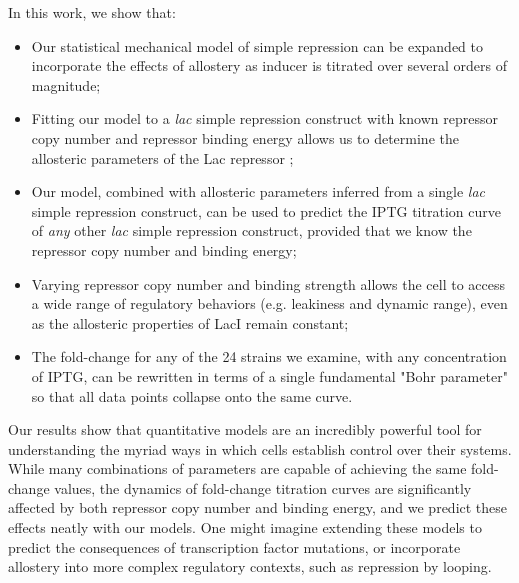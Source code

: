 In this work, we show that:
\begin{itemize}
	\item Our statistical mechanical model of simple repression can be expanded to incorporate the effects of allostery as inducer is titrated over several orders of magnitude;
	\item Fitting our model to a \textit{lac} simple repression construct with known repressor copy number and repressor binding energy allows us to determine the allosteric parameters of the Lac repressor ;
	\item Our model, combined with allosteric parameters inferred from a single \textit{lac} simple repression construct, can be used to predict the IPTG titration curve of \textit{any} other \textit{lac} simple repression construct, provided that we know the repressor copy number and binding energy;
	\item Varying repressor copy number and binding strength allows the cell to access a wide range of regulatory behaviors (e.g. leakiness and dynamic range), even as the allosteric properties of LacI remain constant;
	\item The fold-change for any of the 24 strains we examine, with any concentration of IPTG, can be rewritten in terms of a single fundamental "Bohr parameter" so that all data points collapse onto the same curve. 
\end{itemize}
Our results show that quantitative models are an incredibly powerful tool for understanding the myriad ways in which cells establish control over their systems. While many combinations of parameters are capable of achieving the same fold-change values, the dynamics of fold-change titration curves are significantly affected by both repressor copy number and binding energy, and we predict these effects neatly with our models. One might imagine extending these models to predict the consequences of transcription factor mutations, or incorporate allostery into more complex regulatory contexts, such as repression by looping. 

